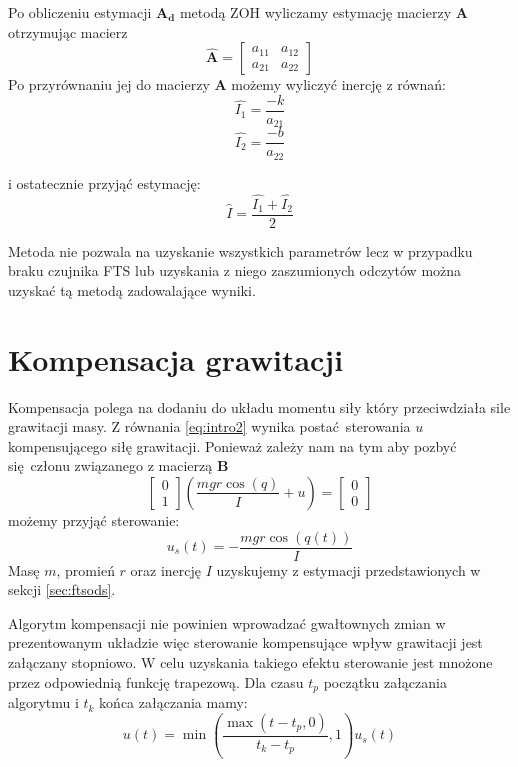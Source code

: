 \documentclass[a4paper, 10pt]{article}
\begin{document}
Po obliczeniu estymacji $\mathbf{A_d}$ metodą ZOH wyliczamy estymację macierzy $\mathbf{A}$ otrzymując macierz
\begin{equation}
\mathbf{\hat{A}} = 	\begin{bmatrix}
a_{11} & a_{12}\\
a_{21} & a_{22}
\end{bmatrix}
\end{equation}
Po przyrównaniu jej do macierzy $\mathbf{A}$ możemy wyliczyć inercję z równań:
\begin{equation}
\hat{I_1} = \frac{-k}{a_{21}}
\end{equation}
\begin{equation}
\hat{I_2} = \frac{-b}{a_{22}}
\end{equation}

i ostatecznie przyjąć estymację:
\begin{equation}
\hat{I} = \frac{\hat{I_1}+\hat{I_2}}{2}
\end{equation}


Metoda nie pozwala na uzyskanie wszystkich parametrów lecz w przypadku braku czujnika FTS lub uzyskania z niego zaszumionych odczytów można uzyskać tą metodą zadowalające wyniki.

\section{Kompensacja grawitacji}
Kompensacja polega na dodaniu do układu momentu siły który przeciwdziała sile grawitacji masy. Z równania \ref{eq:intro2} wynika postać sterowania $u$ kompensującego siłę grawitacji. Ponieważ zależy nam na tym aby pozbyć się członu związanego z macierzą $\mathbf{B}$
\begin{equation}
	\begin{bmatrix}
	0 \\
	1
	\end{bmatrix}
	(\frac{mgr\cos{(q)}}{I} + u) = 	\begin{bmatrix}
	0 \\
	0
	\end{bmatrix}
\end{equation}
możemy przyjąć sterowanie:
\begin{equation}
u_s(t) = -\frac{mgr\cos{(q(t))}}{I}
\end{equation}
Masę $m$, promień $r$ oraz inercję $I$ uzyskujemy z estymacji przedstawionych w sekcji \ref{sec:ftsods}.


Algorytm kompensacji nie powinien wprowadzać gwałtownych zmian w prezentowanym układzie więc sterowanie kompensujące wpływ grawitacji jest załączany stopniowo. W celu uzyskania takiego efektu sterowanie jest mnożone przez odpowiednią funkcję trapezową. Dla czasu $t_p$ początku załączania algorytmu i $t_k$ końca załączania mamy:
\begin{equation}
u(t) = \min{(\frac{\max{( t - t_p, 0)}}{t_k-t_p}, 1)}u_s(t)
\end{equation}
\end{document}
